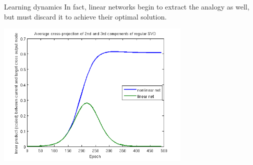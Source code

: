 \documentclass{beamer}
\begin{document}
\begin{frame}{Learning dynamics}
In fact, linear networks begin to extract the analogy as well, but must discard it to achieve their optimal solution.
\begin{center}
\includegraphics[width=0.7\textwidth]{../writing/cogsci_2017/figures/SVD_cross_projection_learning.png}
\end{center}
\end{frame}
\end{document}
